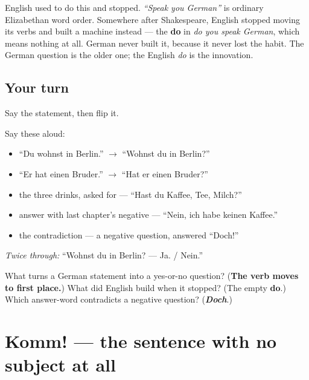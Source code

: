 \begin{culture}
English used to do this and stopped. \emph{\textquotedblleft{}Speak you German\textquotedblright{}} is ordinary Elizabethan word order. Somewhere after Shakespeare, English stopped moving its verbs and built a machine instead — the \textbf{do} in \emph{do you speak German}, which means nothing at all. German never built it, because it never lost the habit. The German question is the older one; the English \emph{do} is the innovation.
\end{culture}

\subsection*{Your turn}
Say the statement, then flip it.

Say these aloud:

\begin{itemize}
\raggedright
  \item \textquotedblleft{}Du wohnst in Berlin.\textquotedblright{} $\to$ \textquotedblleft{}Wohnst du in Berlin?\textquotedblright{}
  \item \textquotedblleft{}Er hat einen Bruder.\textquotedblright{} $\to$ \textquotedblleft{}Hat er einen Bruder?\textquotedblright{}
  \item the three drinks, asked for — \textquotedblleft{}Hast du Kaffee, Tee, Milch?\textquotedblright{}
  \item answer with last chapter's negative — \textquotedblleft{}Nein, ich habe keinen Kaffee.\textquotedblright{}
  \item the contradiction — a negative question, answered \textquotedblleft{}Doch!\textquotedblright{}
\end{itemize}

\emph{Twice through:} \textquotedblleft{}Wohnst du in Berlin? — Ja. / Nein.\textquotedblright{}

\begin{tcolorbox}[breakable,colback=teal!4,colframe=teal!35!black,title={Before you move on}]
What turns a German statement into a yes-or-no question? (\textbf{The verb moves to first place.}) What did English build when it stopped? (The empty \textbf{do}.) Which answer-word contradicts a negative question? (\emph{\textbf{Doch}}.)
\end{tcolorbox}
\section[Komm!]{Komm! — the sentence with no subject at all}

